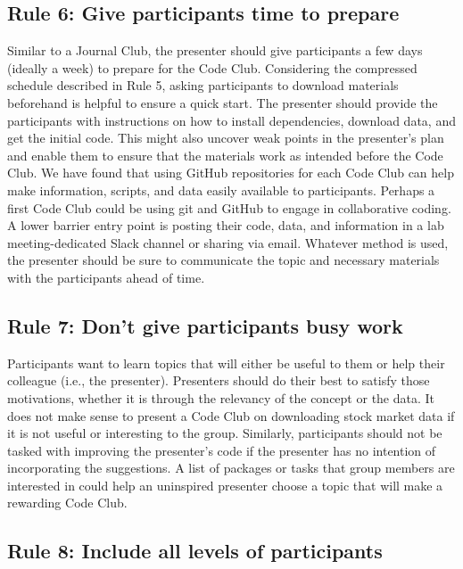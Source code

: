 \documentclass[
  11pt,
]{article}
\begin{document}
\hypertarget{rule-6-give-participants-time-to-prepare}{%
\subsection{Rule 6: Give participants time to
prepare}\label{rule-6-give-participants-time-to-prepare}}

Similar to a Journal Club, the presenter should give participants a few
days (ideally a week) to prepare for the Code Club. Considering the
compressed schedule described in Rule 5, asking participants to download
materials beforehand is helpful to ensure a quick start. The presenter
should provide the participants with instructions on how to install
dependencies, download data, and get the initial code. This might also
uncover weak points in the presenter's plan and enable them to ensure
that the materials work as intended before the Code Club. We have found
that using GitHub repositories for each Code Club can help make
information, scripts, and data easily available to participants. Perhaps
a first Code Club could be using git and GitHub to engage in
collaborative coding. A lower barrier entry point is posting their code,
data, and information in a lab meeting-dedicated Slack channel or
sharing via email. Whatever method is used, the presenter should be sure
to communicate the topic and necessary materials with the participants
ahead of time.

\hypertarget{rule-7-dont-give-participants-busy-work}{%
\subsection{Rule 7: Don't give participants busy
work}\label{rule-7-dont-give-participants-busy-work}}

Participants want to learn topics that will either be useful to them or
help their colleague (i.e., the presenter). Presenters should do their
best to satisfy those motivations, whether it is through the relevancy
of the concept or the data. It does not make sense to present a Code
Club on downloading stock market data if it is not useful or interesting
to the group. Similarly, participants should not be tasked with
improving the presenter's code if the presenter has no intention of
incorporating the suggestions. A list of packages or tasks that group
members are interested in could help an uninspired presenter choose a
topic that will make a rewarding Code Club.

\hypertarget{rule-8-include-all-levels-of-participants}{%
\subsection{Rule 8: Include all levels of
participants}\label{rule-8-include-all-levels-of-participants}}
\end{document}

